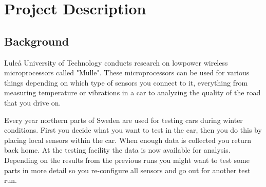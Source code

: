 

\setcounter{page}{2}
\tableofcontents
\newpage
\section{Project Description}
\subsection{Background}
Luleå University of Technology conducts research on lowpower wireless microprocessors called "Mulle". 
These microprocessors can be used for various things depending on which type of sensors you connect to it, everything from measuring temperature or vibrations in a car to analyzing the quality of the road that you drive on.

Every year northern parts of Sweden are used for testing cars during winter conditions.
First you decide what you want to test in the car, then you do this by placing local sensors within the car.
When enough data is collected you return back home.
At the testing facility the data is now available for analysis.
Depending on the results from the previous runs you might want to test some parts in more detail so you re-configure all sensors and go out for another test run.

